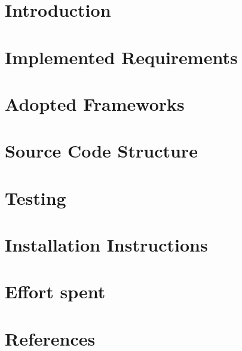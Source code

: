\documentclass{Configuration_Files/PoliMi3i_thesis}
\begin{document}

\chapter{Introduction}


\chapter{Implemented Requirements}


\chapter{Adopted Frameworks}


\chapter{Source Code Structure}


\chapter{Testing}


\chapter{Installation Instructions}


\chapter{Effort spent}


\chapter{References}


\cleardoublepage
\end{document}
